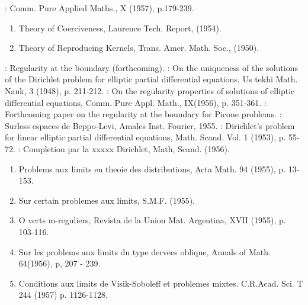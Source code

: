 
\begin{thebibliography}{99}
: Comm. Pure Applied Maths., X (1957), p.179-239.
  \begin{enumerate}
    \item Theory of Coerciveness, Laurence Tech. Report,
      (1954).\label{k2:e1}   

      \item Theory of Reproducing Kernels, Trans. Amer. Math. Soc.,
        (1950).\label{k2:e2}   
  \end{enumerate}

 : Regularity at the
  boundary (forthcoming). 
 : On the uniqueness of the solutions of the
  Dirichlet problem for elliptic partial differential equations, Us
  tekhi Math. Nauk, 3 (1948), p. 211-212. 
 : On the regularity properties of
  solutions of elliptic differential equations, Comm. Pure
  Appl. Math., IX(1956), p. 351-361. 
 : Forthcoming paper on the regularity at
  the boundary for Picone problems. 
 : Surless espaces de
  Beppo-Levi, Amales Inst. Fourier, 1955. 
 : Dirichlet's problem for linear
  elliptic partial differential equations, Math. Scand. Vol. 1
  (1953), p. 55-72. 
 : Completion par la xxxxx
  Dirichlet, Math, Scand. (1956). 
  \begin{enumerate}
    \item  Problems aux limits en theoie des
      distributions, Acta Math. 94 (1955), p. 13-153.\label{k10:e1}

    \item  Sur certain problemes aux limits, S.M.F. (1955).\label{k10:e2}

    \item O verts m-reguliers, Revista de la Union Mat. Argentina,
      XVII (1955), p. 103-116.\label{k10:e3} 

    \item Sur les problems aux limits du type dervees oblique, Annals
      of Math. 64(1956), p, 207 - 239.\label{k10:e4}

    \item  Conditions aux limits de Visik-Soboleff et
      problemes mixtes. C.R.Acad. Sci. T 244 (1957)
      p. 1126-1128.\label{k10:e5}  
      

\end{enumerate}
\end{thebibliography}
